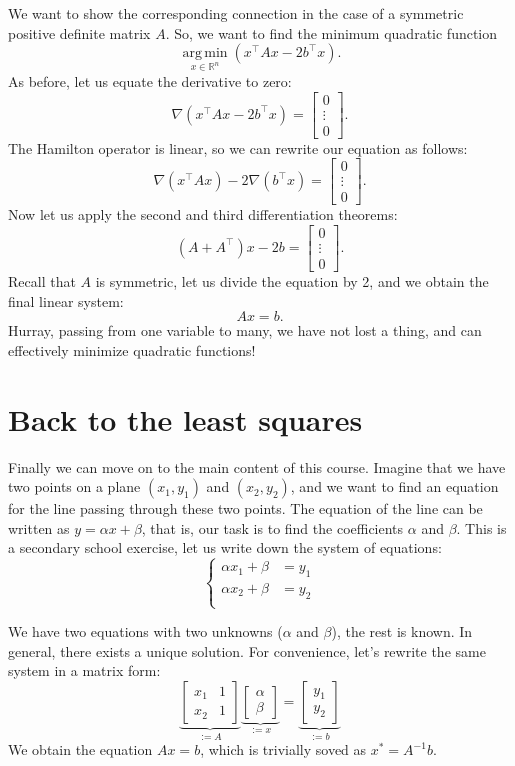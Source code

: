 \documentclass[notitlepage]{report}
\DeclareMathOperator*{\argmin}{arg\,min}
\begin{document}
We want to show the corresponding connection in the case of a symmetric positive definite matrix $A$.
So, we want to find the minimum quadratic function
$$\argmin\limits_{x\in\mathbb R^n} (x^\top A x - 2b^\top x).$$
As before, let us equate the derivative to zero:
$$\nabla (x^\top A x - 2b^\top x) = \begin{bmatrix}0 \\ \vdots \\ 0 \end{bmatrix}.$$
The Hamilton operator is linear, so we can rewrite our equation as follows:
$$\nabla (x^\top A x) - 2\nabla(b^\top x) = \begin{bmatrix}0 \\ \vdots \\ 0 \end{bmatrix}.$$
Now let us apply the second and third differentiation theorems:
$$(A+A^\top)x - 2b = \begin{bmatrix}0 \\ \vdots \\ 0 \end{bmatrix}.$$
Recall that $A$ is symmetric, let us divide the equation by 2, and we obtain the final linear system:
$$Ax = b.$$
Hurray, passing from one variable to many, we have not lost a thing, and can effectively minimize quadratic functions!


\section{Back to the least squares}
Finally we can move on to the main content of this course. Imagine that we have two points on a plane
$(x_1, y_1)$ and $(x_2, y_2)$, and we want to find an equation for the line passing through these two points.
The equation of the line can be written as $y = \alpha x + \beta$, that is, our task is to find the coefficients $\alpha$ and $\beta$.
This is a secondary school exercise, let us write down the system of equations:
$$
\left\{
\begin{split}
\alpha x_1 + \beta &= y_1\\
\alpha x_2 + \beta &= y_2\\
\end{split}
\right.
$$

We have two equations with two unknowns ($\alpha$ and $\beta$), the rest is known.
In general, there exists a unique solution. For convenience, let's rewrite the same system in a matrix form:
$$
\underbrace{\begin{bmatrix}x_1  & 1 \\ x_2 & 1 \end{bmatrix}}_{:=A} 
\underbrace{\begin{bmatrix} \alpha \\ \beta \end{bmatrix}}_{:=x} = \underbrace{\begin{bmatrix} y_1 \\ y_2 \end{bmatrix}}_{:=b}
$$
We obtain the equation $Ax = b$, which is trivially soved as $x^* = A^{-1}b$.
\end{document}
